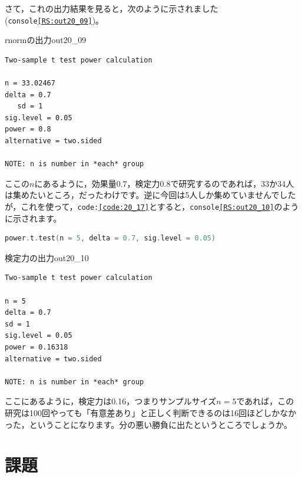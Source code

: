 \documentclass{ltjsbook}
\begin{document}
さて，これの出力結果を見ると，次のように示されました(\texttt{console\ref{RS:out20_09}})。
\begin{Rscreen}{rnormの出力}{out20_09}
	\begin{verbatim}
Two-sample t test power calculation 

n = 33.02467
delta = 0.7
   sd = 1
sig.level = 0.05
power = 0.8
alternative = two.sided

NOTE: n is number in *each* group
\end{verbatim}
\end{Rscreen}
ここの$n$にあるように，効果量0.7，検定力0.8で研究するのであれば，33か34人は集めたいところ，だったわけです。逆に今回は5人しか集めていませんでしたが，これを使って，\texttt{code:\ref{code:20_17}}とすると，\texttt{console\ref{RS:out20_10}}のように示されます。

\begin{lstlisting}[language=c++,label={code:20_17},caption={power.t.testで$n$を固定}]
power.t.test(n = 5, delta = 0.7, sig.level = 0.05)
\end{lstlisting}

\begin{Rscreen}{検定力の出力}{out20_10}
	\begin{verbatim}
Two-sample t test power calculation 

n = 5
delta = 0.7
sd = 1
sig.level = 0.05
power = 0.16318
alternative = two.sided

NOTE: n is number in *each* group
\end{verbatim}
\end{Rscreen}
ここにあるように，検定力は0.16，つまりサンプルサイズ$n=5$であれば，この研究は100回やっても「有意差あり」と正しく判断できるのは16回ほどしかなかった，ということになります。分の悪い勝負に出たというところでしょうか。
\section{課題}
\end{document}
